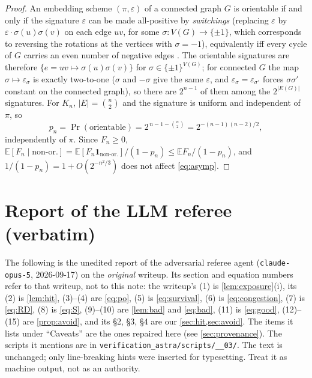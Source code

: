 \documentclass[11pt,a4paper]{article}
\theoremstyle{plain}
\theoremstyle{definition}
\theoremstyle{remark}
\newcommand{\E}{\mathbb E}
\newcommand{\Ind}{\mathbf 1}
\begin{document}
\label{pf:cond}
\propcond*
\begin{proof}
An embedding scheme $(\pi,\varepsilon)$ of a connected graph $G$ is orientable if and only if the signature $\varepsilon$ can be made all-positive by \emph{switchings} (replacing $\varepsilon$ by $\varepsilon\cdot\sigma(u)\sigma(v)$ on each edge $uv$, for some $\sigma\colon V(G)\to\{\pm1\}$, which corresponds to reversing the rotations at the vertices with $\sigma=-1$), equivalently iff every cycle of $G$ carries an even number of negative edges \cite{MT01,GT87}. The orientable signatures are therefore $\{e=uv\mapsto\sigma(u)\sigma(v)\}$ for $\sigma\in\{\pm1\}^{V(G)}$; for connected $G$ the map $\sigma\mapsto\varepsilon_\sigma$ is exactly two-to-one ($\sigma$ and $-\sigma$ give the same $\varepsilon$, and $\varepsilon_\sigma=\varepsilon_{\sigma'}$ forces $\sigma\sigma'$ constant on the connected graph), so there are $2^{n-1}$ of them among the $2^{|E(G)|}$ signatures. For $K_n$, $|E|=\binom n2$ and the signature is uniform and independent of $\pi$, so
\[
p_n=\Pr(\text{orientable})=2^{\,n-1-\binom n2}=2^{-(n-1)(n-2)/2},
\]
independently of $\pi$. Since $F_n\ge0$, $\E[F_n\mid\text{non-or.}]=\E[F_n\Ind_{\text{non-or.}}]/(1-p_n)\le\E F_n/(1-p_n)$, and $1/(1-p_n)=1+O(2^{-n^2/3})$ does not affect \eqref{eq:asymp}.
\end{proof}

\section{Report of the LLM referee (verbatim)}\label{app:referee}

\begin{tcolorbox}[colback=gray!8,colframe=gray!50,boxrule=0.4pt,arc=2pt]
\small The following is the unedited report of the adversarial referee agent (\texttt{claude-opus-5}, 2026-09-17) on the \emph{original} writeup. Its section and equation numbers refer to that writeup, not to this note: the writeup's (1) is \cref{lem:exposure}(i), its (2) is \cref{lem:hit}, (3)--(4) are \eqref{eq:po}, (5) is \eqref{eq:survival}, (6) is \eqref{eq:congestion}, (7) is \eqref{eq:RD}, (8) is \eqref{eq:S}, (9)--(10) are \cref{lem:bad} and \eqref{eq:bad}, (11) is \eqref{eq:good}, (12)--(15) are \cref{prop:avoid}, and its §2, §3, §4 are our \cref{sec:hit,sec:avoid}. The items it lists under ``Caveats'' are the ones repaired here (see \cref{sec:provenance}). The scripts it mentions are in \texttt{verification\_astra/\allowbreak scripts/\_\_03/}. The text is unchanged; only line-breaking hints were inserted for typesetting. Treat it as machine output, not as an authority.
\end{tcolorbox}
\end{document}

